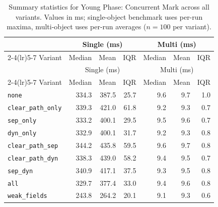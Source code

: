 \begin{longtable}[c]{l rrr rrr}
\caption[Young Phase: Concurrent Mark summary statistics]{Summary statistics for Young Phase: Concurrent Mark across all variants. Values in ms; single-object benchmark uses per-run maxima, multi-object uses per-run averages ($n=100$ per variant).}\label{tab:stats-young-concurrent-mark} \\
\toprule
 & \multicolumn{3}{c}{Single (ms)} & \multicolumn{3}{c}{Multi (ms)} \\
\cmidrule(lr){2-4}\cmidrule(lr){5-7}
Variant & Median & Mean & IQR & Median & Mean & IQR \\
\midrule
\endfirsthead
\toprule
 & \multicolumn{3}{c}{Single (ms)} & \multicolumn{3}{c}{Multi (ms)} \\
\cmidrule(lr){2-4}\cmidrule(lr){5-7}
Variant & Median & Mean & IQR & Median & Mean & IQR \\
\midrule
\endhead
\bottomrule
\endfoot
\texttt{none} & 334.3 & 387.5 & 25.7 & 9.6 & 9.7 & 1.0 \\
\texttt{clear\_path\_only} & 339.3 & 421.0 & 61.8 & 9.2 & 9.3 & 0.7 \\
\texttt{sep\_only} & 333.2 & 400.1 & 29.5 & 9.5 & 9.6 & 0.7 \\
\texttt{dyn\_only} & 332.9 & 400.1 & 31.7 & 9.2 & 9.3 & 0.8 \\
\texttt{clear\_path\_sep} & 344.2 & 435.8 & 59.5 & 9.6 & 9.7 & 0.8 \\
\texttt{clear\_path\_dyn} & 338.3 & 439.0 & 58.2 & 9.4 & 9.5 & 0.7 \\
\texttt{sep\_dyn} & 340.9 & 417.1 & 37.5 & 9.3 & 9.5 & 0.8 \\
\texttt{all} & 329.7 & 377.4 & 33.0 & 9.4 & 9.6 & 0.8 \\
\texttt{weak\_fields} & 243.8 & 264.2 & 20.1 & 9.1 & 9.3 & 0.6 \\
\end{longtable}

